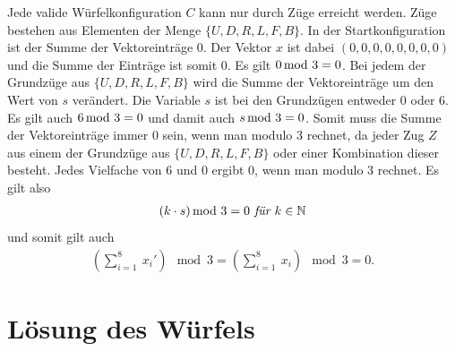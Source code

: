 \documentclass[12pt,a4paper, usenames, dvipsnames]{article}
\theoremstyle{mystyle}
\theoremstyle{definition}
\newcommand{\Gtwo}{\ensuremath{G_{2\times 2\times 2}}}
\begin{document}
Jede valide Würfelkonfiguration $C$ kann nur durch Züge erreicht werden. Züge bestehen aus Elementen der Menge $\{U, D, R, L, F, B\}$. In der Startkonfiguration ist der Summe der Vektoreinträge $0$. Der Vektor $x$ ist dabei $(0,0,0,0,0,0,0,0)$ und die Summe der Einträge ist somit 0. Es gilt $0 \hspace*{-0.5em} \mod 3 = 0$. Bei jedem der Grundzüge aus $\{U, D, R, L, F, B\}$ wird die Summe der Vektoreinträge um den Wert von $s$ verändert. Die Variable $s$ ist bei den Grundzügen entweder 0 oder 6. Es gilt auch $6 \hspace*{-0.5em} \mod 3 = 0$ und damit auch $s \hspace*{-0.5em} \mod 3 = 0$. Somit muss die Summe der Vektoreinträge immer 0 sein, wenn man modulo 3 rechnet, da jeder Zug $Z$ aus einem der Grundzüge aus $\{U, D, R, L, F, B\}$ oder einer Kombination dieser besteht. Jedes Vielfache von 6 und 0 ergibt 0, wenn man modulo 3 rechnet. Es gilt also
\begin{align*}
(k \cdot s) \hspace*{-0.5em} \mod 3 = 0 \textit{ für } k \in \mathbb{N}
\end{align*}
und somit gilt auch
\begin{align*}
(\sum_{i= 1}^{8} \ x_i') \mod 3 = (\sum_{i= 1}^{8} \  x_i) \mod 3 = 0.
\end{align*}


%
%
%
%
%
%
%
%
%
%
%
%
%
%
%
%
%
%
%
%
\newpage


\section{Lösung des Würfels}

\label{Kapitel_Lösung}
\end{document}
